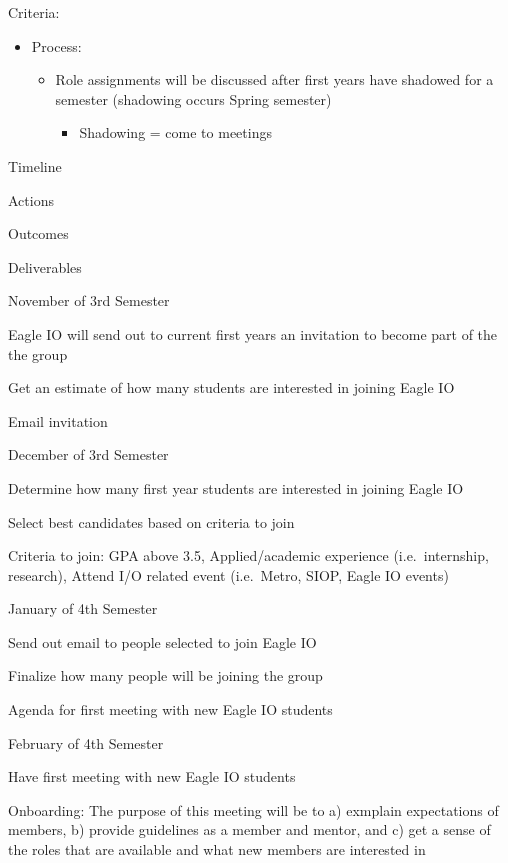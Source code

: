 \documentclass[
]{book}
\providecommand{\tightlist}{%
  \setlength{\itemsep}{0pt}\setlength{\parskip}{0pt}}
\begin{document}
Criteria:

\begin{itemize}
\tightlist
\item
  Process:

  \begin{itemize}
  \tightlist
  \item
    Role assignments will be discussed after first years have shadowed for a semester (shadowing occurs Spring semester)

    \begin{itemize}
    \tightlist
    \item
      Shadowing = come to meetings
    \end{itemize}
  \end{itemize}
\end{itemize}

Timeline

Actions

Outcomes

Deliverables

November of 3rd Semester

Eagle IO will send out to current first years an invitation to become part of the the group

Get an estimate of how many students are interested in joining Eagle IO

Email invitation

December of 3rd Semester

Determine how many first year students are interested in joining Eagle IO

Select best candidates based on criteria to join

Criteria to join: GPA above 3.5, Applied/academic experience (i.e.~internship, research), Attend I/O related event (i.e.~Metro, SIOP, Eagle IO events)

January of 4th Semester

Send out email to people selected to join Eagle IO

Finalize how many people will be joining the group

Agenda for first meeting with new Eagle IO students

February of 4th Semester

Have first meeting with new Eagle IO students

Onboarding: The purpose of this meeting will be to a) exmplain expectations of members, b) provide guidelines as a member and mentor, and c) get a sense of the roles that are available and what new members are interested in
\end{document}
